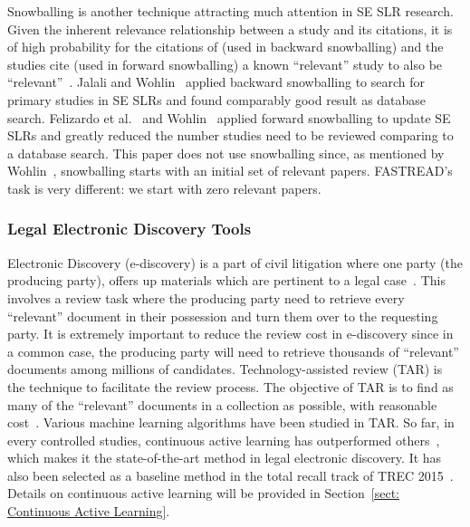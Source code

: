 \documentclass{svjour3}
\theoremstyle{break}
\begin{document}
Snowballing is another technique attracting much attention in SE SLR research. Given the inherent relevance relationship between a study and its citations, it is of high probability for the citations of (used in backward snowballing) and the studies cite (used in forward snowballing) a known ``relevant'' study to also be ``relevant''~\cite{kitchenham2004evidence}. Jalali and Wohlin~\cite{jalali2012systematic,wohlin2014guidelines} applied backward snowballing to search for primary studies in SE SLRs and found comparably good result as database search. Felizardo et al.~\cite{felizardo2016using} and Wohlin~\cite{wohlin2016second} applied forward snowballing to update SE SLRs and greatly reduced the number studies need to be reviewed comparing to a database search. This paper does not use snowballing since, as mentioned by Wohlin~\cite{wohlin2014guidelines}, snowballing starts with an initial set of relevant papers.
FASTREAD's task is very different: we start with zero relevant papers.



\subsubsection{Legal Electronic Discovery Tools}
\label{sect: Electronic Discovery}

Electronic Discovery (e-discovery) is a part of civil litigation where one party (the producing party), offers up materials which are pertinent to a legal case~\cite{krishna2016bigse}. This involves a review task where the producing party need to retrieve every ``relevant'' document in their possession and turn them over to the requesting party. It is extremely important to reduce the review cost in e-discovery since in a common case, the producing party will need to retrieve thousands of ``relevant'' documents among millions of candidates. Technology-assisted review (TAR) is the technique to facilitate the review process. The objective of TAR is to find as many
of the ``relevant'' documents in a collection as possible, with reasonable cost~\cite{grossman2013}. Various machine learning algorithms have been studied in TAR. So far, in every controlled studies, continuous active learning has outperformed others~\cite{cormack2014evaluation,cormack2015autonomy}, which makes it the state-of-the-art method in legal electronic discovery. It has also been selected as a baseline method in the total recall track of TREC 2015~\cite{roegiest2015trec}. Details on continuous active learning will be provided in Section~\ref{sect: Continuous Active Learning}. 
\end{document}

